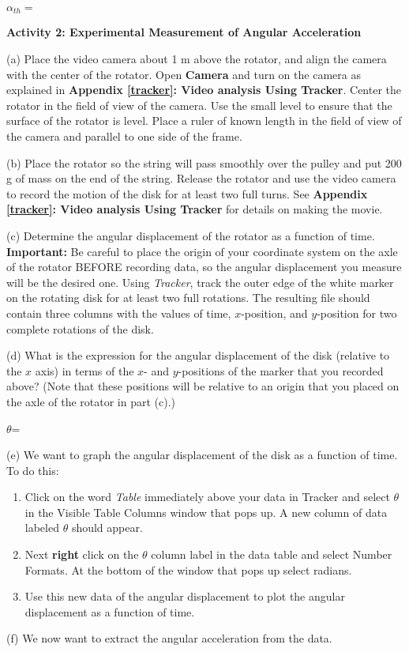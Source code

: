 \( \alpha _{th}= \)
\answerspace{5mm}

\textbf{Activity 2: Experimental Measurement of Angular Acceleration} 

(a) Place the video camera about 1 m above the rotator, and align the camera with the 
center of the rotator. Open \textbf{Camera} and turn on the camera as explained in \textbf{Appendix \ref{tracker}: Video analysis Using Tracker}. Center the rotator in the 
field of view of the camera. Use the small level to ensure that the surface of the rotator 
is level. Place a ruler of known length in the field of view of the camera and parallel to 
one side of the frame.

(b) Place the rotator so the string will pass smoothly over the pulley and put
200 g of mass on the end of the string. Release the rotator and use the
video camera to record the motion of the disk for at least two full turns. See  
\textbf{Appendix \ref{tracker}: Video analysis Using Tracker} for details on 
making the movie.

(c) Determine the angular displacement of the rotator as a function of time. \textbf{Important:} Be careful to place the origin of your coordinate system on the axle of the rotator BEFORE recording data, so the angular displacement you measure will be the desired one. Using \textit{Tracker}, track the outer edge of the white marker on the rotating disk for at least two full rotations. The resulting file should contain three columns with the values of time, $x$-position, and $y$-position for two complete rotations of the disk.

\pagebreak[2]
(d) What is the expression for the angular displacement of the disk (relative to the $x$ axis) in terms of the $x$- and $y$-positions of the marker that you recorded above? (Note that these positions will be relative to an origin that you placed on the axle of the rotator in part (c).)
\vspace{5mm}

\( \theta  \)= 
\bigskip

\newpage
(e) We want to graph the angular displacement of the disk as a function of time.
To do this:

\begin{enumerate}
\item Click on the word {\it Table} immediately above your data in Tracker and select \( \theta \) in the Visible Table Columns window that pops up.  A new column of data labeled \( \theta \) should appear.

\item Next {\bf right} click on the \( \theta \) column label in the data table and select Number Formats.  At the bottom of the window that pops up select radians. 

\item  Use this new data of the angular displacement to plot the angular displacement as a function of time. 

\end{enumerate}
(f) We now want to extract the angular acceleration from the data.

